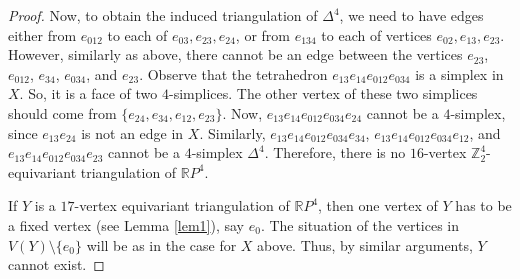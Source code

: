 \documentclass[10pt,a4paper]{amsart}
\def \ZZ{{\bb{Z}}}
\def \bb{\mathbb}
\begin{document}
\begin{proof}
Now, to obtain the induced triangulation of $\Delta^4$, we need to have edges either from $e_{012}$ to each of $e_{03}, e_{23}, e_{24}$, or from $e_{134}$ to each of vertices $e_{02}, e_{13}, e_{23}$. However, similarly as above, there cannot be an edge between the vertices  $e_{23}$, $e_{012}$, $e_{34}$, $e_{034}$, and $e_{23}$. Observe that the tetrahedron $e_{13}e_{14}e_{012}e_{034}$ is a simplex in $X$. So, it is a face of two $4$-simplices. The other vertex of these two simplices should come from $\{e_{24}, e_{34}, e_{12}, e_{23}\}$. Now, $e_{13}e_{14}e_{012}e_{034}e_{24}$ cannot be a $4$-simplex, since $e_{13}e_{24}$ is not an edge in $X$. Similarly, $e_{13}e_{14}e_{012}e_{034}e_{34}$, $e_{13}e_{14}e_{012}e_{034}e_{12}$, and $e_{13}e_{14}e_{012}e_{034}e_{23}$ cannot be a $4$-simplex  $\Delta^4$. Therefore, there is no $16$-vertex $\ZZ_2^4$-equivariant triangulation of $\mathbb{R}P^4$.

If $Y$ is a $17$-vertex equivariant triangulation of $\mathbb{R}P^4$, then one vertex of $Y$ has to be a fixed vertex (see Lemma \ref{lem1}), say $e_0$. The situation of the vertices in $V(Y)\setminus\{e_0\}$ will be as in the case for $X$ above. Thus, by similar arguments,  $Y$ cannot exist.  
\end{proof}
\end{document}
